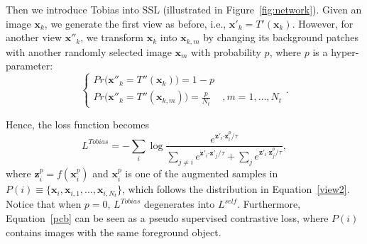 \documentclass[letterpaper]{article} %
\begin{document}
Then we introduce Tobias into SSL (illustrated in Figure~\ref{fig:network}). Given an image $\boldsymbol{x}_k$, we generate the first view as before, i.e., $\boldsymbol{x}'_k=T'(\boldsymbol{x}_k)$. However, for another view $\boldsymbol{x}''_k$, we transform $\boldsymbol{x}_k$ into $\boldsymbol{x}_{k,m}$ by changing its background patches with another randomly selected image $\boldsymbol{x}_m$ with probability $p$, where $p$ is a hyper-parameter:
\begin{equation}
	\label{view2}
	\left\{
	\begin{array}{lcl}
		Pr\big(\boldsymbol{x}''_k=T''(\boldsymbol{x}_k)\big)=1-p&\\
		Pr\big(\boldsymbol{x}''_k=T''(\boldsymbol{x}_{k,m})\big)=\frac{p}{N_t}&, m=1,\dots,N_t
	\end{array} \right. .
\end{equation}

Hence, the loss function becomes
\begin{equation}
	\label{pcb}
	L^{Tobias}=-\sum_{i} \log \frac{e^{\boldsymbol{z}'_i\boldsymbol{\cdot}\boldsymbol{z}^p_i/\tau}}{\sum_{j\neq i} e^{\boldsymbol{z}'_i\boldsymbol{\cdot} \boldsymbol{z}'_j/\tau}+\sum_{j} e^{\boldsymbol{z}'_i\boldsymbol{\cdot} \boldsymbol{z}^p_j/\tau}},
\end{equation}
where $\boldsymbol{z}^p_i=f(\boldsymbol{x}^p_i)$ and $\boldsymbol{x}^p_i$ is one of the augmented samples in $P(i)\equiv\{\boldsymbol{x}_i, \boldsymbol{x}_{i,1}, \dots, \boldsymbol{x}_{i,N_t}\}$, which follows the distribution in Equation~\ref{view2}. Notice that when $p=0$, $L^{Tobias}$ degenerates into $L^{self}$. Furthermore, Equation~\ref{pcb} can be seen as a pseudo supervised contrastive loss, where $P(i)$ contains images with the same foreground object.
\end{document}
